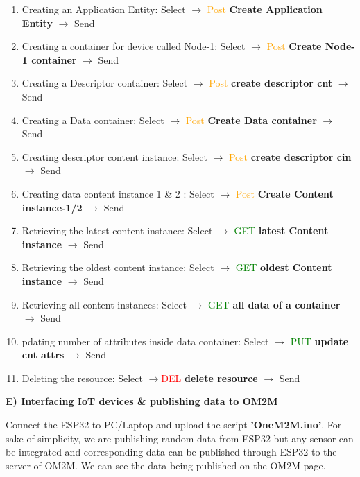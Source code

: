 \documentclass[12pt,a4paper]{article}
\begin{document}
\begin{justify}
\begin{enumerate}
    \begin{enumerate}
    \setlength\itemsep{-0.3em}
        \item Creating an Application Entity: Select $ \rightarrow $ \textcolor{orange}{Post} \textbf{Create Application Entity} $ \rightarrow $ Send
    \item Creating a container for device called Node-1: Select $ \rightarrow $ \textcolor{orange}{Post} \textbf{Create Node-1 container} $ \rightarrow $ Send
    \item Creating a Descriptor container: Select $ \rightarrow $ \textcolor{orange}{Post} \textbf{create descriptor cnt }$ \rightarrow $ Send
    \item Creating a Data container: Select $ \rightarrow $ \textcolor{orange}{Post} \textbf{Create Data container} $ \rightarrow $ Send
    \item Creating descriptor content instance: Select $ \rightarrow $ \textcolor{orange}{Post} \textbf{create descriptor cin }$ \rightarrow $ Send
    \item Creating data content instance 1 \& 2 : Select $ \rightarrow $ \textcolor{orange}{Post} \textbf{Create Content instance-1/2} $ \rightarrow $ Send
    \item Retrieving the latest content instance:  Select $ \rightarrow $ \textcolor{green}{GET} \textbf{latest Content instance} $ \rightarrow $ Send
    \item Retrieving the oldest content instance: Select $ \rightarrow $ \textcolor{green}{GET} \textbf{oldest Content instance} $ \rightarrow $ Send
    \item Retrieving all content instances: Select $ \rightarrow $ \textcolor{green}{GET} \textbf{all data of a container} $ \rightarrow $ Send
    \item pdating number of attributes inside data container: Select $ \rightarrow $ \textcolor{green}{PUT} \textbf{update cnt attrs} $ \rightarrow $ Send
    \item Deleting the resource:  Select $ \rightarrow $\textcolor{red}{DEL} \textbf {delete resource} $ \rightarrow $ Send
    \end{enumerate}
    
\end{enumerate}

\noindent \textbf{E) Interfacing IoT devices \& publishing data  to OM2M}

\noindent Connect the ESP32 to PC/Laptop and upload the script \textbf{'OneM2M.ino'}. For sake of simplicity, we are publishing random data from ESP32 but any sensor can be integrated and corresponding data can be published through ESP32 to the server of OM2M. We can see the data being published on the OM2M page.


\end{justify}
\end{document}
